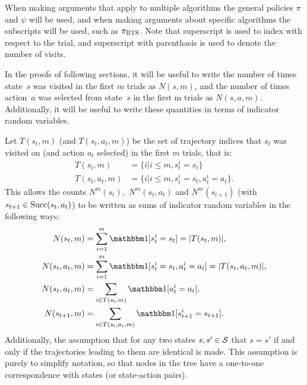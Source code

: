         When making arguments that apply to multiple algorithms the general policies $\pi$ and $\psi$ will be used, and when making arguments about specific algorithms the subscripts will be used, such as ${\pi_{{\textnormal{BTS}}}}$. Note that superscript is used to index with respect to the trial, and superscript with parenthasis is used to denote the number of visits.

        In the proofs of following sections, it will be useful to write the number of times state~$s$ was visited in the first $m$ trials as $N(s,m)$, and the number of times action~$a$ was selected from state~$s$ in the first m trials as $N(s,a,m).$ Additionally, it will be useful to write these quantities in terms of indicator random variables. 
        
        Let $T(s_t,m)$ (and $T(s_t,a_t,m)$) be the set of trajectory indices that $s_t$ was visited on (and action $a_t$ selected) in the first $m$ trials, that is: 
        \begin{align}
            T(s_t,m) &= \{i | i\leq m, s^i_t = s_t \} \\
            T(s_t,a_t,m) &= \{i | i\leq m, s^i_t = s_t, a^i_t = a_t \}.
        \end{align}
        This allows the counts $N^m(s_t),$ $N^m(s_t,a_t)$ and $N^m(s_{t+1})$ (with $s_{t+1}\in{\textnormal{Succ}(s_t,a_t)}$) to be written as sums of indicator random variables in the following ways:
        \begin{align}
            N(s_t,m) &= \sum_{i=1}^m \one[s^i_t=s_t] = |T(s_t,m)|, \\
            N(s_t,a_t,m) &= \sum_{i=1}^m \one[s^i_t=s_t,a^i_t=a_t] = |T(s_t,a_t,m)|, \\ 
            N(s_t,a_t,m) &= \sum_{i\in T(s_t,m)} \one[a^i_t = a_t], \label{appeq:nsa_sum} \\
            N(s_{t+1},m) &= \sum_{i\in T(s_t,a_t,m)} \one[s^i_{t+1} = s_{t+1}]. \label{appeq:ns_sum}
        \end{align}
        Additionally, the assumption that for any two states $s,s'\in\mathcal{S}$  that $s=s'$ if and only if the trajectories leading to them are identical is made. This assumption is purely to simplify notation, so that nodes in the tree have a one-to-one correspondence with states (or state-action pairs). 
        
        
        
